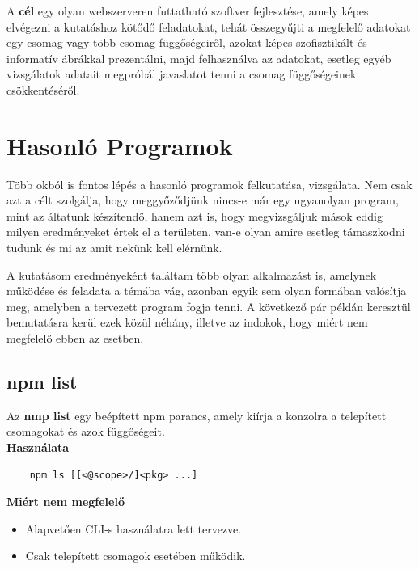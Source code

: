 	A \textbf{cél} egy olyan webszerveren futtatható szoftver fejlesztése, amely képes elvégezni a kutatáshoz kötődő feladatokat, tehát összegyűjti a megfelelő adatokat egy csomag vagy több csomag függőségeiről, azokat képes szofisztikált és informatív ábrákkal prezentálni, majd felhasználva az adatokat, esetleg egyéb vizsgálatok adatait megpróbál javaslatot tenni a csomag függőségeinek csökkentéséről.

\section{Hasonló Programok}

Több okból is fontos lépés a hasonló programok felkutatása, vizsgálata. Nem csak azt a célt szolgálja, hogy meggyőződjünk nincs-e már egy ugyanolyan program, mint az áltatunk készítendő, hanem azt is, hogy megvizsgáljuk mások eddig milyen eredményeket értek el a területen, van-e olyan amire esetleg támaszkodni tudunk és mi az amit nekünk kell elérnünk.

A kutatásom eredményeként találtam több olyan alkalmazást is, amelynek működése és feladata a témába vág, azonban egyik sem olyan formában valósítja meg, amelyben a tervezett program fogja tenni. A következő pár példán keresztül bemutatásra kerül ezek közül néhány, illetve az indokok, hogy miért nem megfelelő ebben az esetben.

	\subsection{npm list}
	
	Az \textbf{nmp list} egy beépített npm parancs, amely kiírja a konzolra a telepített csomagokat és azok függőségeit.\\
	
	\textbf{Használata}
	\begin{verbatim}
	npm ls [[<@scope>/]<pkg> ...]
	\end{verbatim}
	
	\textbf{Miért nem megfelelő}
	\begin{itemize}
		\item Alapvetően CLI-s használatra lett tervezve.
		\item Csak telepített csomagok esetében működik.
	\end{itemize}
	
	\begin{flushright}
		\cite{dep-cruise}
	\end{flushright}
	
